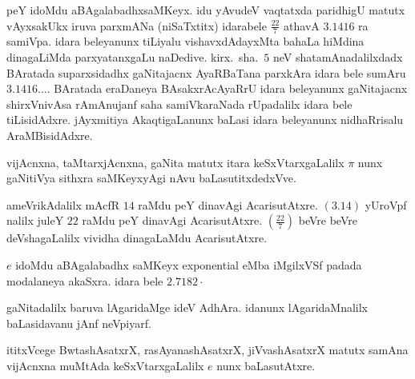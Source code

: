 peY idoMdu aBAgalabadhxsaMKeyx. idu yAvudeV vaqtatxda paridhigU matutx vAyxsakUkx iruva parxmANa (niSaTxtitx) idarabele $\frac{22}{7}$ athavA $3.1416$ ra samiVpa. idara beleyanunx tiLiyalu vishavxdAdayxMta bahaLa hiMdina dinagaLiMda parxyatanxgaLu naDedive. kirx.~sha.\ $5$ neV shatamAnadalilxdadx BAratada suparxsidadhx gaNitajacnx AyaRBaTana parxkAra idara bele sumAru $3.1416\ldots$. BAratada eraDaneya BAsakxrAcAyaRrU idara beleyanunx gaNitajacnx shirxVnivAsa rAmAnujanf saha samiVkaraNada rUpadalilx idara bele tiLisidAdxre. jAyxmitiya AkaqtigaLanunx baLasi idara beleyanunx nidhaRrisalu AraMBisidAdxre. 

vijAcnxna, taMtarxjAcnxna, gaNita matutx itara keSxVtarxgaLalilx $\pi$ nunx gaNitiVya sithxra saMKeyx\-yAgi nAvu baLasutitxdedxVve. 

ameVrikAdalilx mAcfR $14$ raMdu peY dinavAgi AcarisutAtxre. $(3.14)$ yUroVpf nalilx juleY $22$ raMdu peY dinavAgi AcarisutAtxre. $(\frac{22}{7})$ beVre beVre deVshagaLalilx vividha dinagaLaMdu AcarisutAtxre.

$e$ idoMdu aBAgalabadhx saMKeyx {\rm exponential} eMba iMgilxVSf padada modala\-neya akaSxra. idara bele $2.7182\cdot$

gaNitadalilx baruva lAgaridaMge ideV AdhAra. idanunx lAgaridaMnalilx baLasidavanu jAnf neVpiyarf.

ititxVcege BwtashAsatxrX, rasAyanashAsatxrX, jiVvashAsatxrX matutx samAna vijAcnxna muMtAda keSxVtarxgaLalilx $e$ nunx baLasutAtxre.

